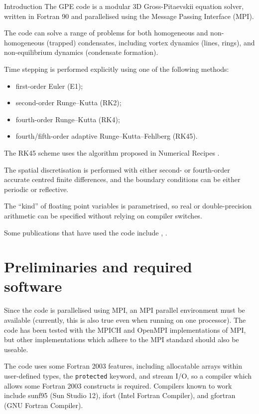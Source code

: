
\begin{chapter}{\label{cha:introduction}Introduction}
  The GPE code is a modular 3D Gross-Pitaevskii equation solver, written in
  Fortran 90 and parallelised using the Message Passing Interface (MPI).
  
  The code can solve a range of problems for both homogeneous and
  non-homogeneous (trapped) condensates, including vortex dynamics (lines,
  rings), and non-equilibrium dynamics (condensate formation).

  Time stepping is performed explicitly using one of the following methods:
  \begin{itemize}
    \item first-order Euler (E1);
    \item second-order Runge--Kutta (RK2);
    \item fourth-order Runge--Kutta (RK4);
    \item fourth/fifth-order adaptive Runge--Kutta--Fehlberg (RK45).
  \end{itemize}
  The RK45 scheme uses the algorithm proposed in Numerical Recipes
  \citep[\S 16.2, p.708,][]{NR92}.
  
  The spatial discretisation is performed with either second- or fourth-order
  accurate centred finite differences, and the boundary conditions can be
  either periodic or reflective.

  The ``kind'' of floating point variables is parametrised, so real or
  double-precision arithmetic can be specified without relying on compiler
  switches.

  Some publications that have used the code include \citet{AYB08},
  \citet{WBPYW10}.

  \section{\label{sec:prelim}Preliminaries and required software}
  Since the code is parallelised using MPI, an MPI parallel environment must be
  available (currently, this is also true even when running on one processor).
  The code has been tested with the MPICH and OpenMPI implementations of MPI,
  but other implementations which adhere to the MPI standard should also be
  useable.

  The code uses some Fortran 2003 features, including allocatable arrays within
  user-defined types, the \verb"protected" keyword, and stream I/O, so a
  compiler which allows some Fortran 2003 constructs is required.  Compilers
  known to work include sunf95 (Sun Studio 12), ifort (Intel Fortran Compiler),
  and gfortran (GNU Fortran Compiler).


\end{chapter}
